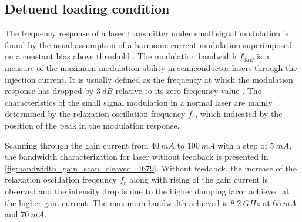 




\subsection{Detuend loading condition}\label{subsec:detuned_laoding_measurement}
The frequency response of a laser transmitter under small signal modulation is found by the usual assumption of a harmonic current modulation superimposed on a constant bias above threshold \cite{tucker1985high}. The modulation bandwidth $f_{3dB}$ is a measure of the maximum modulation ability in semiconductor lasers through the injection current. It is usually defined as the frequency at which the modulation response has dropped by $3 \ dB$ relative to its zero freqeuncy value \cite{ohtsubo2012semiconductor, agrawal2013semiconductor}. The characteristics of the small signal modulation in a normal laser are mainly determined by the relaxation oscillation frequency $f_r$, which indicated by the position of the peak in the modulation response. 

Scanning through the gain current from $40 \ mA$ to $100 \ mA$ with a step of $5 \ mA$, the bandwidth characterization for laser without feedback is presented in \autoref{fig:bandwidth_gain_scan_cleaved_4679}. Without feedabck, the increase of the relaxation oscillation freqeuncy $f_r$ along with rising of the gain current is observed and the intensity drop is due to the higher damping facor achieved at the higher gain current. The maximum bandwidth achieved is $8.2 \ GHz$ at $65 \ mA$ and $70\ mA$.

